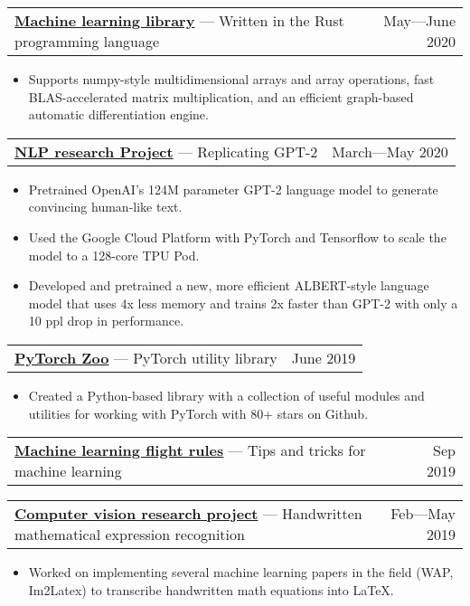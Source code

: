 \documentclass[letterpaper,11pt]{article}
\makeatletter
\newcommand{\heading}[3]{
    \begin{tabular*}{\textwidth}{l@{\extracolsep{\fill}}r}
        \textbf{#1} — #2 & #3
    \end{tabular*}
    \vspace{-1em}
}
\newcommand{\items}[1]{
    \begin{itemize}[topsep=0pt,leftmargin=1em]\itemsep0em
        #1
    \end{itemize}
}
\makeatother
\begin{document}
    \vspace{5pt}

    \heading{\href{https://github.com/bkkaggle/L2}{Machine learning library}}{Written in the Rust programming language}{May—June 2020}
    \items{
        \item Supports numpy-style multidimensional arrays and array operations, fast BLAS-accelerated matrix multiplication, and an efficient graph-based automatic differentiation engine.
    }
    
    \vspace{5pt}

    \heading{\href{https://github.com/bkkaggle/lm-training-research-project}{NLP research Project}}{Replicating GPT-2}{March—May 2020}
    \items{
        \item Pretrained OpenAI's 124M parameter GPT-2 language model to generate convincing human-like text.
        \item Used the Google Cloud Platform with PyTorch and Tensorflow to scale the model to a 128-core TPU Pod. 
        \item Developed and pretrained a new, more efficient ALBERT-style language model that uses 4x less memory and trains 2x faster than GPT-2 with only a 10 ppl drop in performance.
    }

    \vspace{5pt}

    \heading{\href{https://github.com/bkkaggle/pytorch_zoo}{PyTorch Zoo}}{PyTorch utility library}{June 2019}
    \items{
        \item Created a Python-based library with a collection of useful modules and utilities for working with PyTorch with 80+ stars on Github.
    }

    \vspace{5pt}

    \heading{\href{https://github.com/bkkaggle/machine-learning-flight-rules}{Machine learning flight rules}}{Tips and tricks for machine learning}{Sep 2019}

    \vspace{5pt}

    \heading{\href{https://github.com/bkkaggle/math-recognition}{Computer vision research project}}{Handwritten mathematical expression recognition}{Feb—May 2019}
    \items{
        \item Worked on implementing several machine learning papers in the field (WAP, Im2Latex) to transcribe handwritten math equations into LaTeX.
    }
\end{document}
